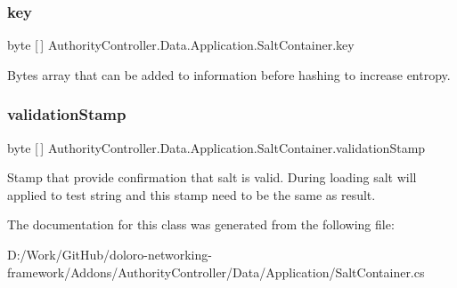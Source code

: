 \subsubsection{\texorpdfstring{key}{key}}
{\footnotesize\ttfamily byte \mbox{[}$\,$\mbox{]} Authority\+Controller.\+Data.\+Application.\+Salt\+Container.\+key}



Bytes array that can be added to information before hashing to increase entropy. 

\mbox{\label{class_authority_controller_1_1_data_1_1_application_1_1_salt_container_adcf2002c95427ded8b59046896b9c355}} 
\subsubsection{\texorpdfstring{validation\+Stamp}{validationStamp}}
{\footnotesize\ttfamily byte \mbox{[}$\,$\mbox{]} Authority\+Controller.\+Data.\+Application.\+Salt\+Container.\+validation\+Stamp}



Stamp that provide confirmation that salt is valid. During loading salt will applied to test string and this stamp need to be the same as result. 



The documentation for this class was generated from the following file\+:\begin{DoxyCompactItemize}
\item 
D\+:/\+Work/\+Git\+Hub/doloro-\/networking-\/framework/\+Addons/\+Authority\+Controller/\+Data/\+Application/Salt\+Container.\+cs\end{DoxyCompactItemize}
